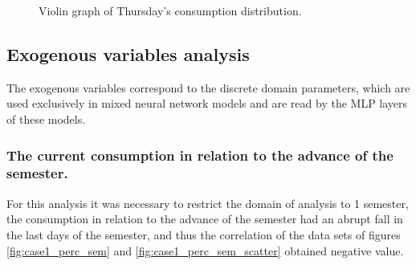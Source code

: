 {\begin{center}
\begin{minipage}[c]{0.45\textwidth}
\begin{figure}[H]
{                	\caption{Violin graph of Thursday's  consumption distribution.} \label{fig:case1_violinplot_quinta} }
                \end{figure}\end{minipage} %
                        \begin{minipage}[c]{0.45\textwidth}
                \begin{figure}[H]
                \end{figure}
                \end{minipage} \end{center} }
    \subsection{Exogenous variables analysis}
        The exogenous variables correspond to the discrete domain parameters, which are used exclusively in mixed neural network models and are read by the MLP layers of these models.
        
        \subsubsection{The current consumption in relation to the advance of the semester.}
        
        For this analysis it was necessary to restrict the domain of analysis to 1 semester, the consumption in relation to the advance of the semester had an abrupt fall in the last days of the semester, and thus the correlation of the data sets of figures \ref{fig:case1_perc_sem} and \ref{fig:case1_perc_sem_scatter} obtained negative value.
        
